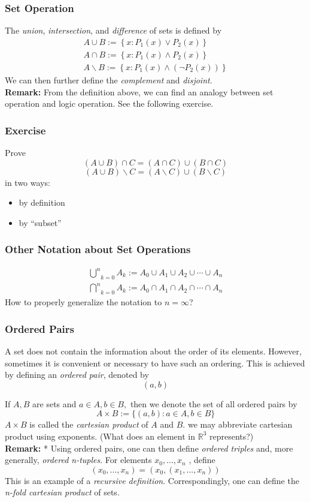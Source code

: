 \documentclass[10pt, t]{beamer}
\renewcommand{\emph}[1]{{\color{bladerunnerblue}\textsl{#1}}}
\newcommand{\R}{\mathbb{R}}
\newcommand{\nullspace}{~\\[15pt]}
\newcommand{\underover}[3]{\underset{#2}{\overset{#3}{#1}}}
\begin{document}
\begin{frame}
    \frametitle{Set Operation}

    The \emph{union}, \emph{intersection}, and \emph{difference} of sets is defined by
    $$\begin{array}{l}
            A \cup B:=\left\{x: P_{1}(x) \vee P_{2}(x)\right\}   \\
            A \cap B:=\left\{x: P_{1}(x) \wedge P_{2}(x)\right\} \\
            A \backslash B:=\left\{x: P_{1}(x) \wedge\left(\neg P_{2}(x)\right)\right\}
        \end{array}$$
    We can then further define the \emph{complement} and \emph{disjoint}.
    \nullspace
    \textbf{Remark:} From the definition above, we can find an analogy between set operation and logic operation. See the following exercise.
\end{frame}

\begin{frame}
    \frametitle{Exercise}
    Prove
    $$(A\cup B)\cap C = (A\cap C)\cup (B\cap C)$$
    $$(A\cup B)\backslash C = (A\backslash C)\cup (B\backslash C)$$
    in two ways:
    \begin{itemize}
        \item by definition
        \item by ``subset''
    \end{itemize}
\end{frame}

\begin{frame}
    \frametitle{Other Notation about Set Operations}
    $$\begin{array}{l}
            \underover{\bigcup}{k=0}{n} A_{k}:=A_{0} \cup A_{1} \cup A_{2} \cup \cdots \cup A_{n} \\
            \underover{\bigcap}{k=0}{n} A_{k}:=A_{0} \cap A_{1} \cap A_{2} \cap \cdots \cap A_{n}
        \end{array}$$
    How to properly generalize the notation to $n=\infty$?
\end{frame}

\begin{frame}
    \frametitle{Ordered Pairs}
    A set does not contain the information about the order of its elements.  However,
    sometimes it is convenient or necessary to have such an ordering. This is
    achieved by defining an \emph{ordered pair}, denoted by
    $$(a,b)$$

    If $A, B$ are sets and $a \in A, b \in B,$ then we denote the set of all ordered pairs by
    $$
        A \times B:=\{(a, b): a \in A, b \in B\}
    $$
    $A \times B$ is called the \emph{cartesian product} of $A$ and $B$. we may abbreviate cartesian product
    using exponents. (What does an element in $\R^3$ represents?)
    \nullspace
    \textbf{Remark:} * Using ordered pairs, one can then define \emph{ordered triples} and, more
    generally, \emph{ordered n-tuples}. For elements $x_0 ,...,x_n$ , define
    $$(x_0 ,...,x_n ) = (x_0 ,(x_1 ,...,x_n ))$$
    This is an example of a \emph{recursive definition}. Correspondingly, one can define the \emph{n-fold cartesian product} of sets. 
\end{frame}
\end{document}
